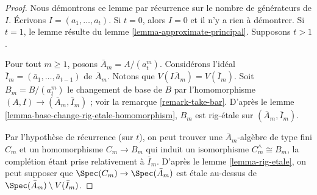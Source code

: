 \begin{proof}
Nous démontrons ce lemme par récurrence sur le nombre de générateurs de $I$.
Écrivons $I = (a_1, \ldots, a_t)$. Si $t = 0$, alors $I = 0$ et il n'y a rien
à démontrer. Si $t = 1$, le lemme résulte du lemme
\ref{lemma-approximate-principal}. Supposons $t > 1$.

\medskip\noindent
Pour tout $m \geq 1$, posons $\bar A_m = A/(a_t^m)$. Considérons l'idéal
$\bar I_m = (\bar a_1, \ldots, \bar a_{t - 1})$ de $\bar A_m$. Notons que
$V(I \bar A_m) = V(\bar I_m)$. Soit $B_m = B/(a_t^m)$ le changement de base
de $B$ par l'homomorphisme $(A, I) \to (\bar A_m, \bar I_m)$ ; voir la
remarque \ref{remark-take-bar}. D'après le lemme
\ref{lemma-base-change-rig-etale-homomorphism}, $B_m$ est rig-étale sur
$(\bar A_m, \bar I_m)$.

\medskip\noindent
Par l'hypothèse de récurrence (sur $t$), on peut trouver une
$\bar A_m$-algèbre de type fini $C_m$ et un homomorphisme $C_m \to B_m$ qui
induit un isomorphisme $C_m^\wedge \cong B_m$, la complétion étant prise
relativement à $\bar I_m$. D'après le lemme \ref{lemma-rig-etale}, on peut
supposer que $\Spec(C_m) \to \Spec(\bar A_m)$ est étale au-dessus de
$\Spec(\bar A_m) \setminus V(\bar I_m)$.


\end{proof}
